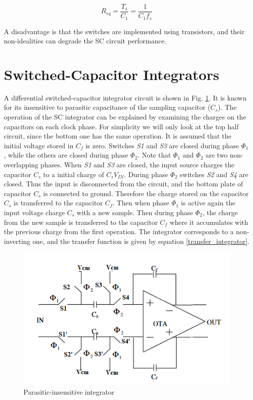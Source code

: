\begin{equation}
    R_{eq} = \frac{T_s}{C_1} = \frac{1}{C_1f_s}
\end{equation}

A disadvantage is that the switches are implemented using transistors, and their non-idealities can degrade the SC circuit performance. 

\section{Switched-Capacitor Integrators}
A differential switched-capacitor integrator circuit is shown in Fig. \ref{fig:DT_integrator}. It is known for its insensitive to parasitic capacitance of the sampling capacitor ($C_s$). The operation of the SC integrator can be explained by examining the charges on the capacitors on each clock phase. For simplicity we will only look at the top half circuit, since the bottom one has the same operation. It is assumed that the initial voltage stored in $C_f$ is zero. Switches \textit{S1} and \textit{S3} are closed during phase $\Phi_1$, while the others are closed during phase $\Phi_2$. Note that $\Phi_1$ and $\Phi_2$ are two non-overlapping phases. When \textit{S1} and \textit{S3} are closed, the input source charges the capacitor $C_s$ to a initial charge of $C_sV_{IN}$. During phase $\Phi_2$ switches \textit{S2} and \textit{S4} are closed. Thus the input is disconnected from the circuit, and the bottom plate of capacitor $C_s$ is connected to ground. Therefore the charge stored on the capacitor $C_s$ is transferred to the capacitor $C_f$. Then when phase $\Phi_1$ is active again the input voltage charge $C_s$ with a new sample. Then during phase $\Phi_2$, the charge from the new sample is transferred to the capacitor $C_f$ where it accumulates with the previous charge from the first operation. The integrator corresponds to a non-inverting one, and the transfer function is given by equation \ref{transfer_integrator}.

\begin{figure}[h]
\centering
\includegraphics[scale=0.8]{images/DT_integrator.png}
\caption{Parasitic-insensitive integrator}
\label{fig:DT_integrator}
\end{figure}



